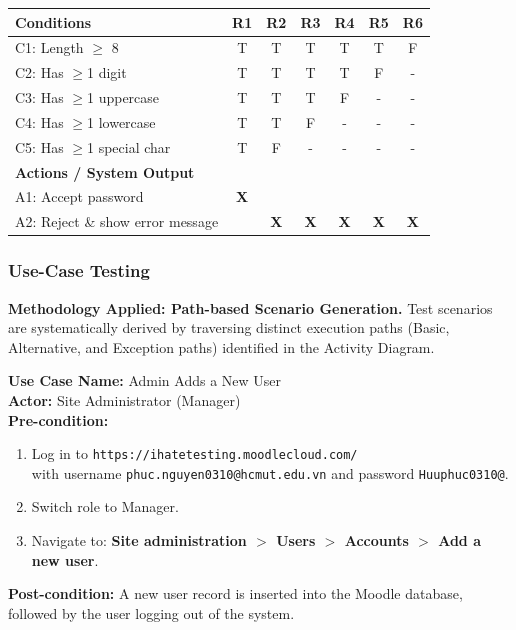 \documentclass[twoside,final]{hcmut-report}
\begin{document}
\begin{table}[H]
\centering
\renewcommand{\arraystretch}{1.2}
\begin{tabularx}{\textwidth}{|>{\raggedright\arraybackslash}X|c|c|c|c|c|c|}
\hline
\textbf{Conditions} & \textbf{R1} & \textbf{R2} & \textbf{R3} & \textbf{R4} & \textbf{R5} & \textbf{R6} \\ \hline
C1: Length $\geq$ 8 & T & T & T & T & T & F \\ \hline
C2: Has $\geq$1 digit & T & T & T & T & F & - \\ \hline
C3: Has $\geq$1 uppercase & T & T & T & F & - & - \\ \hline
C4: Has $\geq$1 lowercase & T & T & F & - & - & - \\ \hline
C5: Has $\geq$1 special char & T & F & - & - & - & - \\ \hline
\hline
\textbf{Actions / System Output} & & & & & & \\ \hline
A1: Accept password & \textbf{X} & & & & & \\ \hline
A2: Reject \& show error message & & \textbf{X} & \textbf{X} & \textbf{X} & \textbf{X} & \textbf{X} \\ \hline
\end{tabularx}
\end{table}

\subsubsection{Use-Case Testing}
\textbf{Methodology Applied: Path-based Scenario Generation.} 
Test scenarios are systematically derived by traversing distinct execution paths (Basic, Alternative, and Exception paths) identified in the Activity Diagram.

\vspace{0.2cm}
\noindent\textbf{Use Case Name:} Admin Adds a New User \\
\textbf{Actor:} Site Administrator (Manager) \\
\textbf{Pre-condition:} 
\begin{enumerate}
    \item Log in to \texttt{https://ihatetesting.moodlecloud.com/} \\ with username \texttt{phuc.nguyen0310@hcmut.edu.vn} and password \texttt{Huuphuc0310@}.
    \item Switch role to Manager.
    \item Navigate to: \textbf{Site administration $>$ Users $>$ Accounts $>$ Add a new user}.
\end{enumerate}
\textbf{Post-condition:} A new user record is inserted into the Moodle database, followed by the user logging out of the system.
\end{document}
